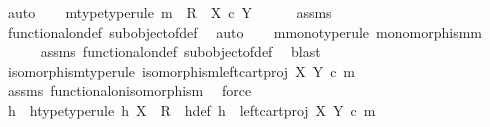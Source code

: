 \begin{isabellebody}
%
\isadelimproof
%
\endisadelimproof
%
\isatagproof
{}\isamarkupfalse%
\ auto\isanewline
\ \ \isamarkupfalse%
\ m{\isacharunderscore}{\kern0pt}type{\isacharbrackleft}{\kern0pt}type{\isacharunderscore}{\kern0pt}rule{\isacharbrackright}{\kern0pt}{\isacharcolon}{\kern0pt}\ {\isachardoublequoteopen}m\ {\isacharcolon}{\kern0pt}\ R\ {\isasymrightarrow}\ X\ {\isasymtimes}\isactrlsub c\ Y{\isachardoublequoteclose}\isanewline
\ \ \ \ \isamarkupfalse%
\ assms\ \isamarkupfalse%
\ functional{\isacharunderscore}{\kern0pt}on{\isacharunderscore}{\kern0pt}def\ subobject{\isacharunderscore}{\kern0pt}of{\isacharunderscore}{\kern0pt}def{}\ \isamarkupfalse%
\ auto\isanewline
\ \ \isamarkupfalse%
\ m{\isacharunderscore}{\kern0pt}mono{\isacharbrackleft}{\kern0pt}type{\isacharunderscore}{\kern0pt}rule{\isacharbrackright}{\kern0pt}{\isacharcolon}{\kern0pt}\ {\isachardoublequoteopen}monomorphism{\isacharparenleft}{\kern0pt}m{\isacharparenright}{\kern0pt}{\isachardoublequoteclose}\isanewline
\ \ \ \ \isamarkupfalse%
\ assms\ functional{\isacharunderscore}{\kern0pt}on{\isacharunderscore}{\kern0pt}def\ subobject{\isacharunderscore}{\kern0pt}of{\isacharunderscore}{\kern0pt}def{}\ \isamarkupfalse%
\ blast\isanewline
\ \ \isamarkupfalse%
\ isomorphism{\isacharbrackleft}{\kern0pt}type{\isacharunderscore}{\kern0pt}rule{\isacharbrackright}{\kern0pt}{\isacharcolon}{\kern0pt}\ {\isachardoublequoteopen}isomorphism{\isacharparenleft}{\kern0pt}left{\isacharunderscore}{\kern0pt}cart{\isacharunderscore}{\kern0pt}proj\ X\ Y\ {\isasymcirc}\isactrlsub c\ m{\isacharparenright}{\kern0pt}{\isachardoublequoteclose}\isanewline
\ \ \ \ \isamarkupfalse%
\ assms\ functional{\isacharunderscore}{\kern0pt}on{\isacharunderscore}{\kern0pt}isomorphism\ \isamarkupfalse%
\ force\isanewline
\ \ \isanewline
\ \ \isamarkupfalse%
\ h\ \ h{\isacharunderscore}{\kern0pt}type{\isacharbrackleft}{\kern0pt}type{\isacharunderscore}{\kern0pt}rule{\isacharbrackright}{\kern0pt}{\isacharcolon}{\kern0pt}\ {\isachardoublequoteopen}h{\isacharcolon}{\kern0pt}\ X\ {\isasymrightarrow}\ R{\isachardoublequoteclose}\ \ h{\isacharunderscore}{\kern0pt}def{\isacharcolon}{\kern0pt}\ {\isachardoublequoteopen}h\ {\isacharequal}{\kern0pt}\ {\isacharparenleft}{\kern0pt}left{\isacharunderscore}{\kern0pt}cart{\isacharunderscore}{\kern0pt}proj\ X\ Y\ {\isasymcirc}\isactrlsub c\ m{\isacharparenright}{\kern0pt}\isactrlbold {\isasyminverse}{\isachardoublequoteclose}\isanewline

\end{isabellebody}
